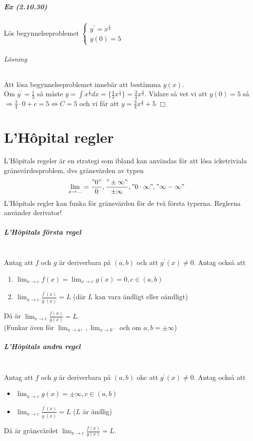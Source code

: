 \paragraph{Ex (2.10.30)} Lös begynnelseproblemet $\left\lbrace\begin{matrix}
        y^\prime=x^\frac{1}{3} \\
        y(0)=5
    \end{matrix}\right.$
\subparagraph{Lösning} Att lösa begynnelseproblemet innebär att bestämma $y(x)$.\\
Om $y^\prime=\frac{1}{3}$ så måste $y=\int x^\frac{1}{3}dx=\{\frac{4}{3}x^\frac{1}{3}\}=\frac{3}{4}x^\frac{4}{3}$.
Vidare så vet vi att $y(0)=5$ så $\Rightarrow \frac{3}{4}\cdot 0+c=5\Leftrightarrow C=5$ och vi får att $y=\frac{3}{4}x^\frac{4}{3}+5$ $\Box$

\chapter{L'Hôpital regler}
L'Hôpitals regeler är en strategi som ibland kan användas för att lösa icketriviala gränsvärdesproblem,
dvs gränsvärden av typen
\begin{equation*}
    \lim_{x\to ...}=\frac{"0"}{0},\frac{"\pm\infty"}{\pm\infty},"0\cdot\infty", "\infty-\infty"
\end{equation*}
L'Hôpitals regler kan funka för gränsvärden för de två första typerna.
Reglerna använder derivator!

\paragraph{L'Hôpitals första regel}~\\
Antag att $f$ och $g$ är deriverbara på $(a,b)$ och att $g^\prime(x)\neq 0$.
Antag också att
\begin{enumerate}
    \item $\lim_{x\to c}f(x)=\lim_{x\to c}g(x)=0,c\in(a,b)$
    \item $\lim_{x\to c}\frac{f^\prime(x)}{g^\prime(x)}=L$ (där $L$ kan vara ändligt eller oändligt)
\end{enumerate}
Då är $\lim_{x\to c}\frac{f(x)}{g(x)}=L$.\\
(Funkar även för $\lim_{x\to a^+},\lim_{x\to b^-}$ och om $a,b=\pm\infty$)

\paragraph{L'Hôpitals andra regel}~\\
Antag att $f$ och $g$ är deriverbara på $(a,b)$ ohc att $g^\prime(x)\neq 0$.
Antag också att
\begin{itemize}
    \item $\lim_{x\to c}g(x)=\pm\infty,c\in(a,b)$
    \item $\lim_{x\to c}\frac{f^\prime(x)}{g^\prime(x)}=L$ ($L$ är ändlig)
\end{itemize}
Då är gränsvärdet $\lim_{x\to c}\frac{f(x)}{g(x)}=L$.


